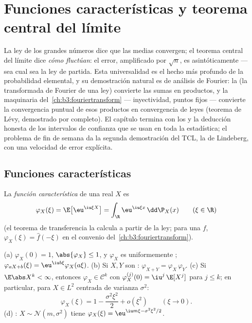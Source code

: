 \chapter{Funciones características y teorema central del
límite}\label{ch:b3:clt}

La ley de los grandes números dice que las medias convergen; el teorema
central del límite dice \emph{cómo fluctúan}: el error, amplificado por
$\sqrt n$, es asintóticamente
 --- sea cual sea la ley de
partida. Esta universalidad es el hecho más profundo de la probabilidad
elemental, y su demostración natural es de análisis de Fourier: la
\emph{} (la transformada
de Fourier de una ley) convierte las sumas
 en productos, y
la maquinaria del~\cref{ch:b3:fouriertransform} --- inyectividad, puntos
fijos  --- convierte la
convergencia puntual de esos productos en convergencia de leyes (teorema
de Lévy, demostrado por completo). El capítulo termina con los
 y la deducción
honesta de los intervalos de confianza que se usan en toda la
estadística; el problema de fin de semana da la segunda demostración del
TCL, la de Lindeberg, con una velocidad de error explícita.

\section{Funciones características}

\begin{definition}\label{def:b3:clt:cf}
La \emph{función característica} de una
 real $X$ es
\[
\varphi_X(\xi) = \E\bigl[\eu^{\iu\xi X}\bigr]
= \int_\R \eu^{\iu\xi x}\,\dd\P_X(x)
\qquad (\xi \in \R)
\]
(el teorema de transferencia la calcula a partir de la ley; para una
 $f$,
$\varphi_X(\xi) = \hat f(-\xi)$ en el convenio
del~\cref{ch:b3:fouriertransform}).
\end{definition}

\begin{proposition}\label{prop:b3:clt:cfbasics}
(a) $\varphi_X(0) = 1$, $\abs{\varphi_X} \leq 1$, y $\varphi_X$ es
uniformemente ;
$\varphi_{aX + b}(\xi) = \eu^{\iu b\xi}\varphi_X(a\xi)$.
(b) Si $X, Y$ son
\emph{}:
$\varphi_{X+Y} = \varphi_X\,\varphi_Y$.
(c) Si $\E\abs X^k < \infty$, entonces $\varphi_X \in \mathcal
C^k$ con $\varphi_X^{(j)}(0) = \iu^j\,\E[X^j]$ para $j \leq
k$; en particular, para $X \in L^2$ centrada de varianza
$\sigma^2$:
\[
\varphi_X(\xi) = 1 - \frac{\sigma^2\xi^2}{2} +
o(\xi^2) \qquad (\xi \to 0).
\]
(d) :
$X \sim \mathcal N(m, \sigma^2)$ tiene
$\varphi_X(\xi) = \eu^{\iu m\xi - \sigma^2\xi^2/2}$.
\end{proposition}

